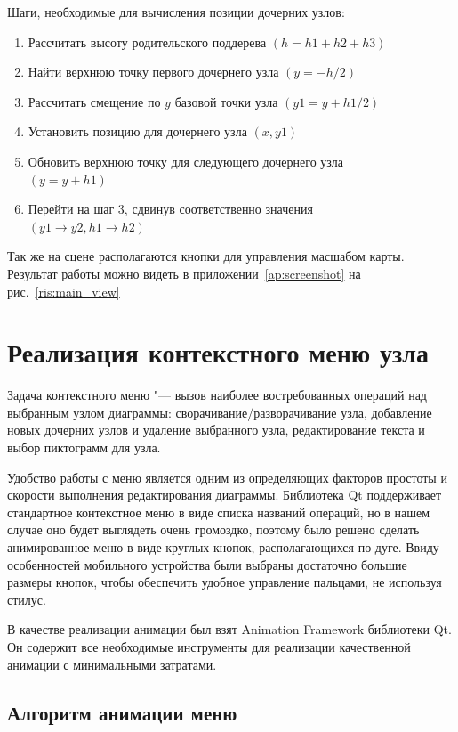 Шаги, необходимые для вычисления позиции дочерних узлов:
\begin{enumerate}
\item
Рассчитать высоту родительского поддерева $(h = h1+h2+h3)$
\item
Найти верхнюю точку первого дочернего узла $(y=-h/2)$
\item
Рассчитать смещение по $y$ базовой точки узла $(y1=y+h1/2)$
\item
Установить позицию для дочернего узла $(x, y1)$
\item
Обновить верхнюю точку для следующего дочернего узла\\ $(y=y+h1)$
\item
Перейти на шаг 3, сдвинув соответственно значения\\ $(y1 \to y2, h1 \to h2)$
\end{enumerate}

Так же на сцене располагаются кнопки для управления масшабом карты. Результат работы можно видеть в приложении~\ref{ap:screenshot} на рис.~\ref{ris:main_view}

\section{Реализация контекстного меню узла}\label{sec:context_menu}

Задача контекстного меню "--- вызов наиболее востребованных операций над выбранным узлом диаграммы: сворачивание/разворачивание узла, добавление новых дочерних узлов и удаление выбранного узла, редактирование текста и выбор пиктограмм для узла.

Удобство работы с меню является одним из определяющих факторов простоты и скорости выполнения редактирования диаграммы.
Библиотека Qt поддерживает стандартное контекстное меню в виде списка названий операций, но в нашем случае оно будет выглядеть очень громоздко, поэтому было решено сделать анимированное меню в виде круглых кнопок, располагающихся по дуге. Ввиду особенностей мобильного устройства были выбраны достаточно большие размеры кнопок, чтобы обеспечить удобное управление пальцами, не используя стилус.

В качестве реализации анимации был взят Animation Framework библиотеки Qt. Он содержит все необходимые инструменты для реализации качественной анимации с минимальными затратами.

\subsection*{Алгоритм анимации меню}

